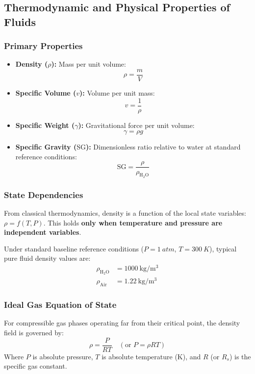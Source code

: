 \subsection{Thermodynamic and Physical Properties of Fluids}

\subsubsection{Primary Properties}
\begin{itemize}
    \item \textbf{Density ($\rho$):} Mass per unit volume:
    \begin{equation}
        \rho = \frac{m}{V}
    \end{equation}
    \item \textbf{Specific Volume ($v$):} Volume per unit mass:
    \begin{equation}
        v = \frac{1}{\rho}
    \end{equation}
    \item \textbf{Specific Weight ($\gamma$):} Gravitational force per unit volume:
    \begin{equation}
        \gamma = \rho g
    \end{equation}
    \item \textbf{Specific Gravity ($\text{SG}$):} Dimensionless ratio relative to water at standard reference conditions:
    \begin{equation}
        \text{SG} = \frac{\rho}{\rho_{\text{H}_2\text{O}}}
    \end{equation}
\end{itemize}

\subsubsection{State Dependencies}
From classical thermodynamics, density is a function of the local state variables: $\rho = f(T, P)$. This holds \textbf{only when temperature and pressure are independent variables}.

Under standard baseline reference conditions ($P = \SI{1}{atm}$, $T = \SI{300}{K}$), typical pure fluid density values are:
\begin{align}
    \rho_{\text{H}_2\text{O}} &= \SI{1000}{\kilogram\per\cubic\meter} \\
    \rho_{\text{Air}} &= \SI{1.22}{\kilogram\per\cubic\meter}
\end{align}

\subsubsection{Ideal Gas Equation of State}
For compressible gas phases operating far from their critical point, the density field is governed by:
\begin{equation}
    \rho = \frac{P}{R T} \quad \left(\text{or } P = \rho R T\right)
\end{equation}
Where $P$ is absolute pressure, $T$ is absolute temperature ($\si{\kelvin}$), and $R$ (or $R_s$) is the specific gas constant.

